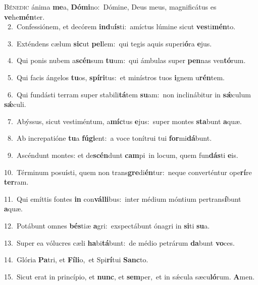 \lettrine{\initial\textcolor{\initialcolor}{B}}{énedic} ánima \textbf{me}\-a, \textbf{Dó}\-\textbf{mi}no:~\star Dómine, Deus meus, magnificátus es \textbf{ve}\-he\-\textbf{mén}\-ter.\\
{\numbfont\textcolor{\numbcolor}{~2.}}~Confessiónem, et decórem \textbf{ind}\-u\-\textbf{ís}\-ti:~\star amíctus lúmine sicut \textbf{ves}\-ti\-\textbf{mén}\-to.\par
{\numbfont\textcolor{\numbcolor}{~3.}}~Exténdens cælum \textbf{sic}\-ut \textbf{pel}\-lem:~\star qui tegis aquis superi\-\textbf{ó}\-ra \textbf{e}\-jus.\par
{\numbfont\textcolor{\numbcolor}{~4.}}~Qui ponis nubem a\-\textbf{scén}\-sum \textbf{tu}\-um:~\star qui ámbulas super \textbf{pen}\-nas ven\-\textbf{tó}\-rum.\par
{\numbfont\textcolor{\numbcolor}{~5.}}~Qui facis ángelos \textbf{tu}\-os, \textbf{spí}\-\textbf{ri}tus:~\star et minístros tuos \textbf{i}\-gnem u\-\textbf{rén}\-tem.\par
{\numbfont\textcolor{\numbcolor}{~6.}}~Qui fundásti terram super stabili\-\textbf{tá}\-tem \textbf{su}\-am:~\star non inclinábitur in \textbf{sǽ}\-culum \textbf{sǽ}\-culi.\par
{\numbfont\textcolor{\numbcolor}{~7.}}~Abýssus, sicut vestiméntum, a\-\textbf{míc}\-tus \textbf{e}\-jus:~\star super montes \textbf{sta}\-bunt \textbf{a}\-quæ.\par
{\numbfont\textcolor{\numbcolor}{~8.}}~Ab increpatióne \textbf{tu}\-a \textbf{fú}\-\textbf{gi}ent:~\star a voce tonítrui tui \textbf{for}\-mi\-\textbf{dá}\-bunt.\par
{\numbfont\textcolor{\numbcolor}{~9.}}~Ascéndunt montes: et de\-\textbf{scén}\-dunt \textbf{cam}\-pi~\star in locum, quem fun\-\textbf{dás}\-ti \textbf{e}\-is.\par
{\numbfont\textcolor{\numbcolor}{10.}}~Términum posuísti, quem non trans\-\textbf{gre}\-di\-\textbf{én}\-tur:~\star neque converténtur ope\-\textbf{rí}\-re \textbf{ter}\-ram.\par
{\numbfont\textcolor{\numbcolor}{11.}}~Qui emíttis fontes \textbf{in} con\-\textbf{vál}\-\textbf{li}bus:~\star inter médium móntium pertrans\-\textbf{í}\-bunt \textbf{a}\-quæ.\par
{\numbfont\textcolor{\numbcolor}{12.}}~Potábunt omnes \textbf{bés}\-tiæ \textbf{a}\-gri:~\star exspectábunt ónagri in \textbf{si}\-ti \textbf{su}\-a.\par
{\numbfont\textcolor{\numbcolor}{13.}}~Super ea vólucres cæli \textbf{ha}\-bi\-\textbf{tá}\-bunt:~\star de médio petrárum \textbf{da}\-bunt \textbf{vo}\-ces.\par
{\numbfont\textcolor{\numbcolor}{14.}}~Glória \textbf{Pa}\-tri, et \textbf{Fí}\-\textbf{li}o,~\star et Spi\-\textbf{rí}\-tui \textbf{Sanc}\-to.\par
{\numbfont\textcolor{\numbcolor}{15.}}~Sicut erat in princípio, et \textbf{nunc}\-, et \textbf{sem}\-per,~\star et in sǽcula sæcu\-\textbf{ló}\-rum. \textbf{A}\-men.\par
